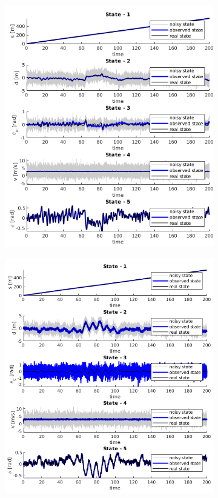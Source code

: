 \begin{figure}[h]
	\begin{subfigure}{0.49\textwidth}
		\includegraphics[width=\textwidth]{figures/observer_100_states.png}
	\end{subfigure}	
	\begin{subfigure}{0.49\textwidth}
		\includegraphics[width=\textwidth]{figures/observer_95_states.png}

\end{subfigure}
\end{figure}
